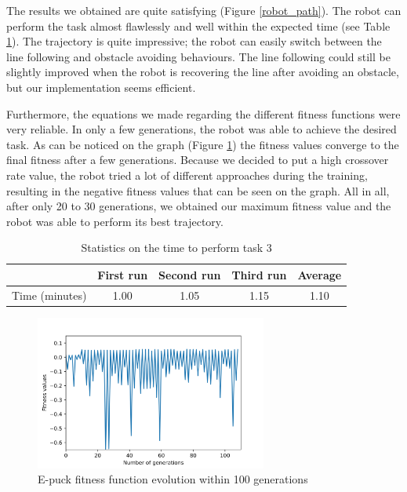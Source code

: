 \documentclass[lettersize,journal]{IEEEtran}
\begin{document}
The results we obtained are quite satisfying (Figure \ref{robot_path}). The robot can perform the task almost flawlessly and well within the expected time (see Table \ref{tab2}). The trajectory is quite impressive; the robot can easily switch between the line following and obstacle avoiding behaviours. The line following could still be slightly improved when the robot is recovering the line after avoiding an obstacle, but our implementation seems efficient.
\par
Furthermore, the equations we made regarding the different fitness functions were very reliable. In only a few generations, the robot was able to achieve the desired task. As can be noticed on the graph (Figure \ref{fitness_values}) the fitness values converge to the final fitness after a few generations. Because we decided to put a high crossover rate value, the robot tried a lot of different approaches during the training, resulting in the negative fitness values that can be seen on the graph. All in all, after only 20 to 30 generations, we obtained our maximum fitness value and the robot was able to perform its best trajectory.

\begin{table}[H]
\begin{center}
\caption{Statistics on the time to perform task 3}
\label{tab2}
\begin{tabular}{| c | c | c | c | c |}
\hline
   & First run & Second run & Third run & Average\\[.1em]
\hline
Time (minutes) & 1.00 & 1.05 & 1.15 & 1.10\\[.1em]
\hline
\end{tabular}
\end{center}
\end{table}

\begin{figure}[H]
\centering
\includegraphics[width=3in]{fitness.jpg}
\caption{E-puck fitness function evolution within 100 generations}
\label{fitness_values}
\end{figure}
\end{document}
